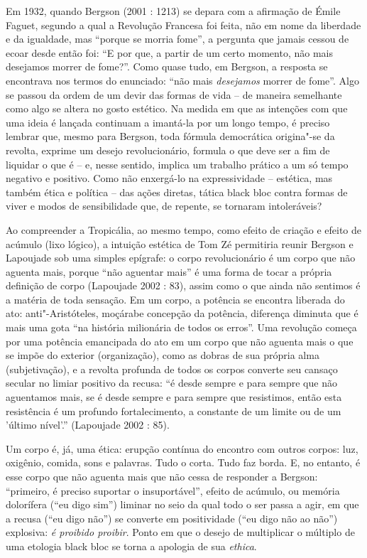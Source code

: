 Em 1932, quando Bergson (2001 : 1213) se depara com a afirmação de Émile
Faguet, segundo a qual a Revolução Francesa foi feita, não em nome da
liberdade e da igualdade, mas ``porque se morria fome'', a pergunta que
jamais cessou de ecoar desde então foi: ``E por que, a partir de um
certo momento, não mais desejamos morrer de fome?''. Como quase tudo, em
Bergson, a resposta se encontrava nos termos do enunciado: ``não mais
\emph{desejamos }morrer de fome''. Algo se passou da ordem de um devir
das formas de vida -- de maneira semelhante como algo se altera no gosto
estético. Na medida em que as intenções com que uma ideia é lançada
continuam a imantá-la por um longo tempo, é preciso lembrar que, mesmo
para Bergson, toda fórmula democrática origina"-se da revolta, exprime um
desejo revolucionário, formula o que deve ser a fim de liquidar o que é
-- e, nesse sentido, implica um trabalho prático a um só tempo negativo
e positivo. Como não enxergá-lo na expressividade -- estética, mas
também ética e política -- das ações diretas, tática black bloc contra
formas de viver e modos de sensibilidade que, de repente, se tornaram
intoleráveis?

Ao compreender a Tropicália, ao mesmo tempo, como efeito de criação e
efeito de acúmulo (lixo lógico), a intuição estética de Tom Zé
permitiria reunir Bergson e Lapoujade sob uma simples epígrafe: o corpo
revolucionário é um corpo que não aguenta mais, porque ``não aguentar
mais'' é uma forma de tocar a própria definição de corpo (Lapoujade 2002
: 83), assim como o que ainda não sentimos é a matéria de toda sensação.
Em um corpo, a potência se encontra liberada do ato: anti"-Aristóteles,
moçárabe concepção da potência, diferença diminuta que é mais uma gota
``na história milionária de todos os erros''. Uma revolução começa por
uma potência emancipada do ato em um corpo que não aguenta mais o que se
impõe do exterior (organização), como as dobras de sua própria alma
(subjetivação), e a revolta profunda de todos os corpos converte seu
cansaço secular no limiar positivo da recusa: ``é desde sempre e para
sempre que não aguentamos mais, se é desde sempre e para sempre que
resistimos, então esta resistência é um profundo fortalecimento, a
constante de um limite ou de um 'último nível'.'' (Lapoujade 2002 : 85).

Um corpo é, já, uma ética: erupção contínua do encontro com outros
corpos: luz, oxigênio, comida, sons e palavras. Tudo o corta. Tudo faz
borda. E, no entanto, é esse corpo que não aguenta mais que não cessa de
responder a Bergson: ``primeiro, é preciso suportar o insuportável'',
efeito de acúmulo, ou memória dolorífera (``eu digo sim'') liminar no
seio da qual todo o ser passa a agir, em que a recusa (``eu digo não'')
se converte em positividade (``eu digo não ao não'') explosiva: \emph{é
proibido proibir}. Ponto em que o desejo de multiplicar o múltiplo de
uma etologia black bloc se torna a apologia de sua \emph{ethica}.

